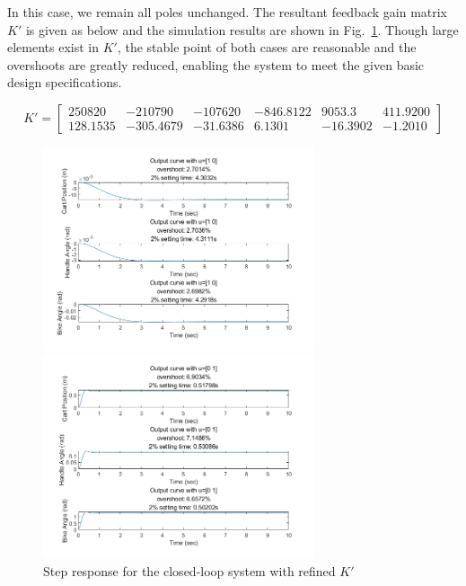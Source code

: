 \documentclass[hyperref]{article}
\theoremstyle{nonumberplain}
\begin{document}
	In this case, we remain all poles unchanged. The resultant feedback gain matrix ${K}'$ is given as below and the simulation results are shown in Fig.~\ref{fig4}. Though large elements exist in ${K}'$, the stable point of both cases are reasonable and the overshoots are greatly reduced, enabling the system to meet the given basic design specifications.
	

	\begin{equation}
	{K}'=\begin{bmatrix}
	250820 &-210790  &-107620  &-846.8122  &9053.3  &411.9200 \\ 
	128.1535 &-305.4679  &-31.6386  &6.1301  &-16.3902  &-1.2010 
	\end{bmatrix}
	\nonumber
	\end{equation}
	
	\begin{figure}[htbp]
		\centering
		\begin{minipage}[t]{0.48\textwidth}
			\centering
			\includegraphics[width=8cm]{fig37.png}
		\end{minipage}
		\begin{minipage}[t]{0.48\textwidth}
			\centering
			\includegraphics[width=8cm]{fig38.png}
		\end{minipage}
		\caption{Step response for the closed-loop system with refined ${K}'$}
		\label{fig4}
	\end{figure}
	 
\end{document}
